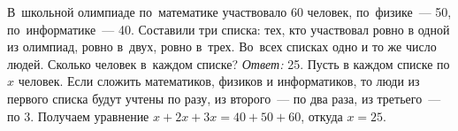 \problem
В~школьной олимпиаде по~математике участвовало 60 человек, по~физике~--- 50,
по~информатике~--- 40.
Составили три списка: тех, кто участвовал ровно в одной из олимпиад, ровно
в~двух, ровно в~трех.
Во~всех списках одно и то же число людей.
Сколько человек в~каждом списке?
\solution
\emph{Ответ:} 25.
Пусть в каждом списке по $x$ человек.
Если сложить математиков, физиков и информатиков, то люди из первого списка
будут учтены по разу, из второго~--- по два раза, из третьего~--- по 3.
Получаем уравнение $x + 2 x + 3 x = 40 + 50 + 60$, откуда $x = 25$.
\endproblem
